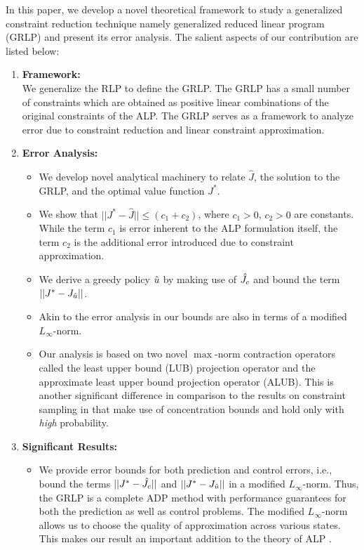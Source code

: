 \documentclass[12pt,draftcls,onecolumn]{IEEEtran}
\begin{document}
In this paper, we develop a novel theoretical framework to study a generalized constraint reduction technique namely generalized reduced linear program (GRLP) and present its error analysis. The salient aspects of our contribution are listed below:
\begin{enumerate}
\item \textbf{Framework:}\\ We generalize the RLP to define the GRLP. The GRLP has a small number of constraints which are obtained as positive linear combinations of the original constraints of the ALP. The GRLP serves as a framework to analyze error due to constraint reduction and linear constraint approximation.
\item \textbf{Error Analysis:}
	\begin{itemize}
		\item We develop novel analytical machinery to relate $\hat{J}$, the solution to the GRLP, and the optimal value function $J^*$. 
		\item We show that $||J^*-\hat{J}||\leq (c_1+c_2)$, where $c_1>0$, $c_2>0$ are constants. While the term $c_1$ is error inherent to the ALP formulation itself, the term $c_2$ is the additional error introduced due to constraint approximation.  
		\item We derive a greedy policy $\hat{u}$ by making use of $\hat{J}_c$ and bound the term $||J^*-J_{\hat{u}}||$. 
		\item Akin to the error analysis in \cite{ALP,CS,SALP} our bounds are also in terms of a modified $L_\infty$-norm.
		\item Our analysis is based on two novel $\max$-norm contraction operators called the least upper bound (LUB) projection operator and the approximate least upper bound projection operator (ALUB). This is another significant difference in comparison to the results on constraint sampling in \cite{SALP,CS} that make use of concentration bounds and hold only with \emph{high} probability.
\end{itemize}
\item \textbf{Significant Results:}
	\begin{itemize}
		\item We provide error bounds for both prediction and control errors, i.e., bound the terms $||J^*-\hat{J}_c||$ and $||J^*-J_{\hat{u}}||$ in a modified $L_\infty$-norm. Thus, the GRLP is a complete ADP method with performance guarantees for both the prediction as well as control problems. The modified $L_\infty$-norm allows us to choose the quality of approximation across various states. This makes our result an important addition to the theory of ALP \cite{ALP,CS,CST,SALP}.

\end{itemize}
\end{enumerate}
\end{document}
